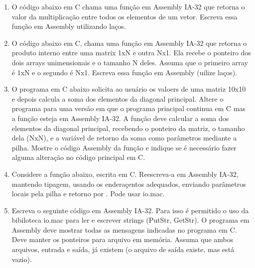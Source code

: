 \begin{enumerate}[resume]
    \begin{itemize}
        \item [(a)] 
        \item [(b)] 
        \item [(c)] 
        \item [(d)] 
    \end{itemize}

    \item   
    O código abaixo em C chama uma função em Assembly IA-32 que
    retorna o valor da multiplicação entre todos os elementos de um vetor.
    Escreva essa função em Assembly utilizando laços.

    \item
    O código abaixo em C, chama uma função em Assembly IA-32 que 
    retorna o produto interno entre uma matrix 1xN e outra Nx1.
    Ela recebe o ponteiro dos dois arrays unimensionais e o tamanho N deles.
    Assuma que o primeiro array é 1xN e o segundo é Nx1.
    Escreva essa função em Assembly (uilize laços).

    \item
    O programa em C abaixo solicita ao usuário os valoers de uma matriz 10x10
    e depois calcula a soma dos elementos da diagonal principal.
    Altere o programa para uma versão em que o programa principal continua em C
    mas a função  esteja em Assembly IA-32.
    A função deve calcular a soma dos elementos da diagonal principal,
    recebendo o ponteiro da matriz, o tamanho dela (NxN),
    e a variável de retorno da soma como parâmetros mediante a pilha.
    Mostre o código Assembly da função 
    e indique se é necessário fazer alguma alteração no código principal em C. 

    \item
    Considere a função  abaixo, escrita em C.
    Reescreva-a em Assembly IA-32, mantendo tipagem, 
    usando os enderaçentos adequados,
    enviando parâmetros locais pela pilha
    e retorno por .
    Pode usar io.mac.

    \item
    Escreva o seguinte código em Assembly IA-32.
    Para isso é permitido o uso da bibiloteca io.mac
    para ler e escrever strings (PutStr, GetStr).
    O programa em Assembly deve mostrar 
    todas as mensagens indicadas no programa em C.
    Deve manter os ponteiros para arquivo em memória.
    Assuma que ambos arquivos, entrada e saída, já existem 
    (o arquivo de saída existe, mas está vazio).


\end{enumerate}
